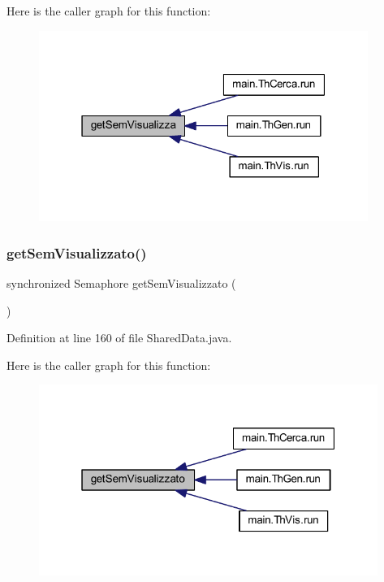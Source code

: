 Here is the caller graph for this function\+:
\nopagebreak
\begin{figure}[H]
\begin{center}
\leavevmode
\includegraphics[width=304pt]{classmain_1_1_shared_data_aa61763e3e67d28f279815eda9e81e0bd_icgraph}
\end{center}
\end{figure}
\mbox{\label{classmain_1_1_shared_data_a3bc58a39321bc72c013baca2abb19a0a}} 
\subsubsection{\texorpdfstring{get\+Sem\+Visualizzato()}{getSemVisualizzato()}}
{\footnotesize\ttfamily synchronized Semaphore get\+Sem\+Visualizzato (\begin{DoxyParamCaption}{ }\end{DoxyParamCaption})}



Definition at line 160 of file Shared\+Data.\+java.

Here is the caller graph for this function\+:
\nopagebreak
\begin{figure}[H]
\begin{center}
\leavevmode
\includegraphics[width=313pt]{classmain_1_1_shared_data_a3bc58a39321bc72c013baca2abb19a0a_icgraph}
\end{center}
\end{figure}
\mbox{\label{classmain_1_1_shared_data_a34af1e216aea720d07a45ca716b8893b}} 
